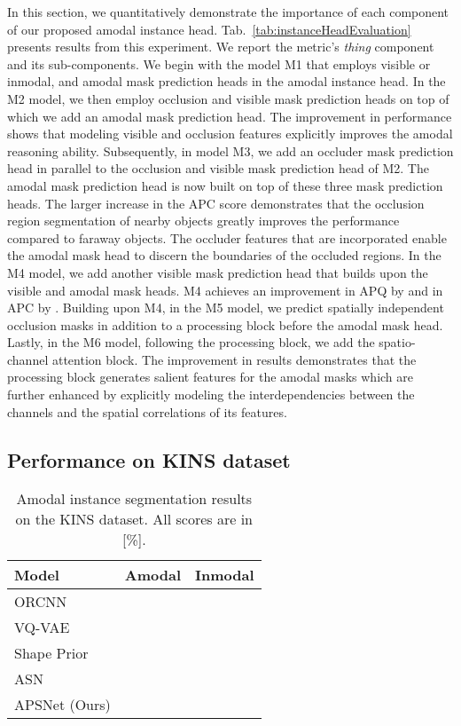 \documentclass[10pt,twocolumn,letterpaper]{article}
\newcommand{\tabref}[1]{Tab.~\ref{#1}}
\begin{document}
In this section, we quantitatively demonstrate the importance of each component of our proposed amodal instance head. \tabref{tab:instanceHeadEvaluation} presents results from this experiment. We report the metric's \textit{thing} component and its sub-components. We begin with the model M1 that employs visible or inmodal, and amodal mask prediction heads in the amodal instance head. In the M2 model, we then employ occlusion and visible mask prediction heads on top of which we add an amodal mask prediction head. The improvement in performance shows that modeling visible and occlusion features explicitly improves the amodal reasoning ability. Subsequently, in model M3, we add an occluder mask prediction head in parallel to the occlusion and visible mask prediction head of M2. The amodal mask prediction head is now built on top of these three mask prediction heads. The larger increase in the APC score demonstrates that the occlusion region segmentation of nearby objects greatly improves the performance compared to faraway objects. The occluder features that are incorporated enable the amodal mask head to discern the boundaries of the occluded regions. In the M4 model, we add another visible mask prediction head that builds upon the visible and amodal mask heads. M4 achieves an improvement in APQ by  and in APC by . Building upon M4, in the M5 model, we predict spatially independent occlusion masks in addition to a processing block before the amodal mask head. Lastly, in the M6 model, following the processing block, we add the spatio-channel attention block. The improvement in results demonstrates that the processing block generates salient features for the amodal masks which are further enhanced by explicitly modeling the interdependencies between the channels and the spatial correlations of its features.

\subsection{Performance on KINS dataset}\label{sec:kins}
\begin{table}
\footnotesize 
\centering
\begin{tabular}{p{2.5cm}|p{1.2cm}p{1.2cm}}
\toprule
Model &  Amodal & Inmodal \\
\midrule
ORCNN~\cite{follmann2019learning}  &  &  \\
VQ-VAE~\cite{jang2020learning}  &  &  \\
Shape Prior~\cite{yuting2021amodal}  &  &  \\
ASN~\cite{qi2019amodal}  &  &   \\
\midrule
\mbox{APSNet} (Ours)  &   &  \\
\bottomrule
\end{tabular}
\vspace{-0.2cm}
\caption{Amodal instance segmentation results on the KINS dataset. All scores are in [\%].}
\label{tab:kins}
\vspace{-0.4cm}
\end{table}
\end{document}
